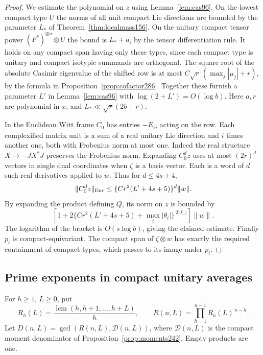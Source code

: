 \documentclass[a4paper,11pt]{article}
\theoremstyle{definition}
\theoremstyle{remark}
\numberwithin{equation}{section}
\begin{document}
\begin{proof}
We estimate the polynomial on \(z\) using
Lemma~\ref{lem:cas96}. On the lowest compact type \(U\) the
norms of all unit compact Lie directions are bounded by the
parameter \(L_*\) of Theorem~\ref{thm:localmass156}. On the
unitary compact tensor power \((F^*)^{\otimes a}\otimes U\)
the bound is \(L_*+a\), by the tensor differentiation rule.
It holds on any compact span having only these types, since
each compact type is unitary and compact isotypic summands
are orthogonal. The square root of the absolute Casimir
eigenvalue of the shifted row is at most
\(C\sqrt r\,(\max_j|\mu_j|+r)\), by the formula in
Proposition~\ref{prop:cofactor286}. Together these furnish
a parameter \(L'\) in Lemma~\ref{lem:cas96} with
\(\log(2+L')=O(\log b)\). Here \(a,r\) are polynomial in \(x\),
and \(L_*\ll\sqrt r(2b+r)\).

In the Euclidean Witt frame \(C_0\) has entries
\(-E_{ij}\) acting on the row. Each complexified matrix
unit is a sum of a real unitary Lie direction and \(i\)
times another one, both with Frobenius norm at most one.
Indeed the real structure \(X\mapsto-JX^*J\) preserves
the Frobenius norm. Expanding \(C_0^d z\) uses at most
\((2r)^d\) vectors in single dual coordinates when \(\zeta\)
is a basis vector. Each is a word of \(d\) such real
derivatives applied to \(w\). Thus for \(d\le 4s+4\),
\[
 \|C_0^d z\|_{\rm Euc}\le
     \{C r^2(L'+4s+5)\}^{d}\|w\|.
\]
By expanding the product defining \(Q\), its norm on \(z\)
is bounded by
\[
 \left[1+2\{C r^2(L'+4s+5)+\max_i|\theta_i|\}^{\,2|J_-|}\right]\|w\|.
\]
The logarithm of the bracket is \(O(s\log b)\), giving the
claimed estimate. Finally \(p_i\) is compact-equivariant.
The compact span of \(\zeta\otimes w\) has exactly the
required containment of compact types, which passes to its
image under \(p_i\).
\end{proof}

\subsection{Prime exponents in compact unitary averages}\label{nav:VII-63}
For \(h\ge1\), \(L\ge0\), put
\[
 R_h(L)=\frac{\operatorname{lcm}(h,h+1,\ldots,h+L)}{h},
 \qquad R(n,L)=\prod_{h=1}^{n-1}R_h(L)^{\,n-h}.
\]
Let \(D(n,L)=\gcd(R(n,L),\mathcal D(n,L))\), where
\(\mathcal D(n,L)\) is the compact moment denominator of
Proposition~\ref{prop:moments242}. Empty products are one.
\end{document}
